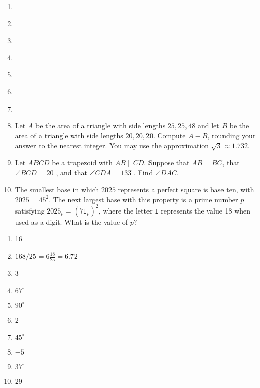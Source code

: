 \documentclass{article}
\begin{document}
\begin{enumerate}
\item \underline{\hspace{3in}}\vspace{1cm}
\item \underline{\hspace{3in}}\vspace{1cm}
\item \underline{\hspace{3in}}\vspace{1cm}
\item \underline{\hspace{3in}}\vspace{1cm}
\item \underline{\hspace{3in}}\vspace{1cm}
\item \underline{\hspace{3in}}\vspace{1cm}
\item \underline{\hspace{3in}}\vspace{1cm}
\item Let $A$ be the area of a triangle with side lengths $25,25,48$ and let $B$ be the area of a triangle with side lengths $20,20,20$. Compute $A - B$, rounding your answer to the nearest \underline{integer}. You may use the approximation $\sqrt{3}\approx 1.732$. 
\vspace{1cm}
\item Let $ABCD$ be a trapezoid with $\overline{AB}\parallel\overline{CD}$. Suppose that $AB = BC$, that $\angle BCD = 20^{\circ}$, and that $\angle CDA = 133^{\circ}$. Find $\angle DAC$.
\vspace{1cm}
\item The smallest base in which $2025$ represents a perfect square is base ten, with $2025 = 45^2$. The next largest base with this property is a prime number $p$ satisfying $2025_p = (7\texttt{I}_p)^2$, where the letter $\texttt{I}$ represents the value 18 when used as a digit. What is the value of $p$?
\end{enumerate}


\newpage

\begin{enumerate}
\item 16
\item $168/25 = 6\tfrac{18}{25} = 6.72$
\item 3
\item $67^{\circ}$
\item $90^{\circ}$
\item 2
\item $45^{\circ}$
\item $-5$
\item $37^{\circ}$
\item 29
\end{enumerate}
\end{document}
